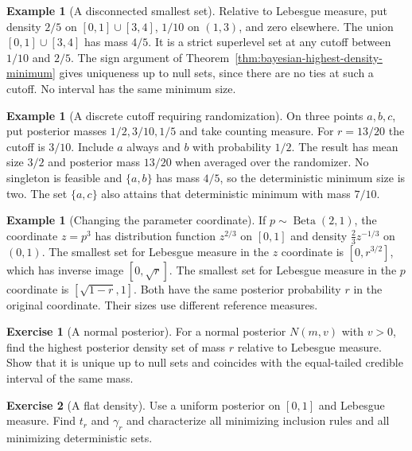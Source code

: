 \documentclass[11pt,oneside]{book}
\theoremstyle{definition}
\newtheorem{example}[theorem]{Example}
\newtheorem{exercise}{Exercise}[section]
\theoremstyle{remark}
\begin{document}
\begin{example}[A disconnected smallest set]
\label{ex:bayesian-hpd-disconnected}
Relative to Lebesgue measure, put density $2/5$ on
$[0,1]\cup[3,4]$, $1/10$ on $(1,3)$, and zero elsewhere.
The union $[0,1]\cup[3,4]$ has mass $4/5$. It is a strict
superlevel set at any cutoff between $1/10$ and $2/5$.
The sign argument of Theorem~\ref{thm:bayesian-highest-density-minimum}
gives uniqueness up to null sets, since there are no ties at such
a cutoff. No interval has the same minimum size.
\end{example}

\begin{example}[A discrete cutoff requiring randomization]
\label{ex:bayesian-hpd-discrete}
On three points $a,b,c$, put posterior masses $1/2,3/10,1/5$
and take counting measure. For $r=13/20$ the cutoff is $3/10$.
Include $a$ always and $b$ with probability $1/2$. The
result has mean size $3/2$ and posterior mass $13/20$ when
averaged over the randomizer. No singleton is feasible and
$\{a,b\}$ has mass $4/5$, so the deterministic minimum size
is two. The set $\{a,c\}$ also attains that deterministic
minimum with mass $7/10$.
\end{example}

\begin{example}[Changing the parameter coordinate]
\label{ex:bayesian-hpd-coordinate}
If $p\sim\operatorname{Beta}(2,1)$, the coordinate $z=p^3$ has
distribution function $z^{2/3}$ on $[0,1]$ and density
$\tfrac23 z^{-1/3}$ on $(0,1)$. The smallest set for Lebesgue
measure in the $z$ coordinate is $[0,r^{3/2}]$, which has
inverse image $[0,\sqrt r]$. The smallest set for Lebesgue
measure in the $p$ coordinate is $[\sqrt{1-r},1]$.
Both have the same posterior probability $r$ in the original
coordinate. Their sizes use different reference measures.
\end{example}

\begin{exercise}[A normal posterior]
\label{exer:bayesian-hpd-normal}
For a normal posterior $N(m,v)$ with $v>0$, find the highest
posterior density set of mass $r$ relative to Lebesgue
measure. Show that it is unique up to null sets and coincides
with the equal-tailed credible interval of the same mass.
\end{exercise}

\begin{exercise}[A flat density]
\label{exer:bayesian-hpd-flat}
Use a uniform posterior on $[0,1]$ and Lebesgue measure.
Find $t_r$ and $\gamma_r$ and characterize all minimizing
inclusion rules and all minimizing deterministic sets.
\end{exercise}
\end{document}
